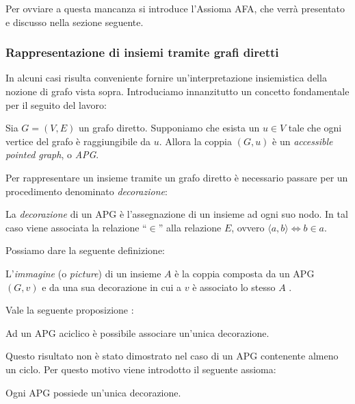 Per ovviare a questa mancanza si introduce l'Assioma AFA, che verrà presentato e discusso nella sezione seguente.


\subsubsection{Rappresentazione di insiemi tramite grafi diretti}
\label{sec:graphs_sets}
In alcuni casi risulta conveniente fornire un'in\-ter\-pre\-ta\-zio\-ne insiemistica della nozione di grafo vista sopra. Introduciamo innanzitutto un concetto fondamentale per il seguito del lavoro:
\begin{definition}
    Sia $G = (V, E)$ un grafo diretto. Supponiamo che esista un $u \in V$ tale che ogni vertice del grafo è raggiungibile da $u$. Allora la coppia $(G, u)$ è un \emph{accessible pointed graph}, o \emph{APG}.
\end{definition}

Per rappresentare un insieme tramite un grafo diretto è necessario passare per un procedimento denominato \emph{decorazione}:
\begin{definition}
    La \emph{decorazione} di un APG è l'assegnazione di un insieme ad ogni suo nodo. In tal caso viene associata la relazione ``$\in$'' alla relazione $E$, ovvero $\langle a,b \rangle \iff b \in a$.
\end{definition}

Possiamo dare la seguente definizione:
\begin{definition}
    L'\emph{immagine} (o \emph{picture}) di un insieme $A$ è la coppia composta da un APG $(G,v)$ e da una sua decorazione in cui a $v$ è associato lo stesso $A$ \cite{aczel}.
\end{definition}

Vale la seguente proposizione \cite{aczel}:
\begin{proposition}
    Ad un APG aciclico è possibile associare un'unica decorazione.
\end{proposition}

Questo risultato non è stato dimostrato nel caso di un APG contenente almeno un ciclo. Per questo motivo viene introdotto il seguente assioma:
\begin{axiom}
    Ogni APG possiede un'unica decorazione.
\end{axiom}

